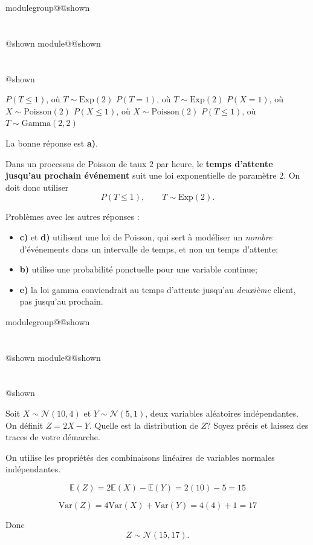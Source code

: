 \documentclass{Evaluation}
\makeatletter
\newcommand{\currentmodulekey}{}
\newcommand{\currentmoduletitle}{}
\newcommand{\currentgroupkey}{}
\newcommand{\currentgrouptitle}{}
\newcommand{\showmoduleifneeded}{%
  \ifx\currentgroupkey\empty\else
    \expandafter\ifx\csname modulegroup@\currentgroupkey @shown\endcsname\relax
      \section*{\currentgrouptitle}%
      \expandafter\gdef\csname modulegroup@\currentgroupkey @shown\endcsname{1}%
    \fi
  \fi
  \expandafter\ifx\csname module@\currentmodulekey @shown\endcsname\relax
    \section*{\currentmoduletitle}%
    \expandafter\gdef\csname module@\currentmodulekey @shown\endcsname{1}%
  \fi
}
\newenvironment{H26}{\showmoduleifneeded}{}
\makeatother
\begin{document}
\begin{questions}
\begin{H26}
\begin{checkboxes}
\correctchoice $P(T\leq 1)$, où $T\sim \mathrm{Exp}(2)$
\choice $P(T=1)$, où $T\sim \mathrm{Exp}(2)$
\choice $P(X=1)$, où $X\sim \mathrm{Poisson}(2)$
\choice $P(X\leq 1)$, où $X\sim \mathrm{Poisson}(2)$
\choice $P(T\leq 1)$, où $T\sim \mbox{Gamma}(2,2)$
\end{checkboxes}

\begin{solution}
La bonne réponse est \textbf{a)}.

Dans un processus de Poisson de taux $2$ par heure, le \textbf{temps d’attente jusqu’au prochain événement} suit une loi exponentielle de paramètre $2$. On doit donc utiliser
$$
P(T\leq 1), \qquad T\sim \mathrm{Exp}(2).
$$

Problèmes avec les autres réponses : 
\begin{itemize}
\item \textbf{c)} et \textbf{d)} utilisent une loi de Poisson, qui sert à modéliser un \emph{nombre} d’événements dans un intervalle de temps, et non un temps d’attente;
\item \textbf{b)} utilise une probabilité ponctuelle pour une variable continue;
\item \textbf{e)} la loi gamma conviendrait au temps d’attente jusqu’au \emph{deuxième} client, pas jusqu’au prochain.
\end{itemize}
\end{solution}
\end{H26}

\begin{H26}
\question {} %
Soit $X \sim \mathcal{N}(10, 4)$ et $Y \sim \mathcal{N}(5, 1)$, deux variables aléatoires indépendantes. \\
On définit $Z = 2X - Y$. Quelle est la distribution de $Z$? Soyez précis et laissez des traces de votre démarche.

\begin{solution}
On utilise les propriétés des combinaisons linéaires de variables normales indépendantes.

$$
\mathbb{E}(Z) = 2\mathbb{E}(X) - \mathbb{E}(Y) = 2(10) - 5 = 15
$$

$$
\mathrm{Var}(Z) = 4\mathrm{Var}(X) + \mathrm{Var}(Y) = 4(4) + 1 = 17
$$

Donc
$$
Z \sim \mathcal{N}(15, 17).
$$

\end{solution}
\end{H26}


\end{questions}
\end{document}
